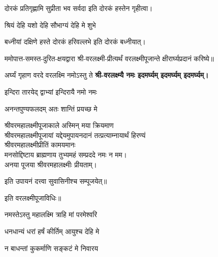 \begin{center}
{दोरकं प्रतिगृह्णामि सुप्रीता भव सर्वदा} 
इति दोरकं हस्तेन गृहीत्वा।


{श्रियं देहि यशो देहि सौभाग्यं देहि मे शुभे}

{बध्नीयां दक्षिणे हस्ते दोरकं हरिवल्लभे}
इति दोरकं बध्नीयात्।


ममोपात्त-समस्त-दुरित-क्षयद्वारा श्री-वरलक्ष्मी-प्रीत्यर्थं वरलक्ष्मीपूजान्ते क्षीरार्घ्यप्रदानं करिष्ये॥

{अर्घ्यं गृहाण वरदे वरलक्ष्मि नमोऽस्तु ते} 
\textbf{श्री-वरलक्ष्म्यै नमः इदमर्घ्यम् इदमर्घ्यम् इदमर्घ्यम्।}


{इन्दिरा तारयेद् द्वाभ्यां इन्दिरायै नमो नमः}

{अनन्तपुण्यफलदम् अतः शान्तिं प्रयच्छ मे}

श्रीवरमहालक्ष्मीपूजाकाले अस्मिन् मया क्रियमाण\\
श्रीवरमहालक्ष्मीपूजायां यद्देयमुपायनदानं तत्प्रत्याम्नायार्थं हिरण्यं\\
श्रीवरमहालक्ष्मीप्रीतिं कामयमानः\\
मनसोद्दिष्टाय ब्राह्मणाय तुभ्यमहं सम्प्रददे नमः न मम।\\ 
अनया पूजया श्रीवरमहालक्ष्मीः प्रीयताम्। 

इति उपायनं दत्त्वा सुवासिनीश्च सम्पूजयेत्॥


इति वरलक्ष्मीपूजाविधिः॥

\end{center}





{नमस्तेऽस्तु महालक्ष्मि त्राहि मां परमेश्वरि}

{धनधान्यं धरां हर्षं कीर्तिम् आयुश्च देहि मे}

{न बाधन्तां कुकर्माणि सङ्कटं मे निवारय}






